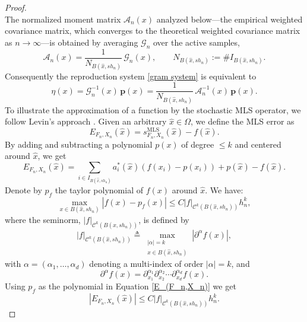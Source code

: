 \documentclass{article}
\newcommand{\mlsfunstoch}{s^\text{MLS}_{F_n,X_n}}
\begin{document}
\begin{proof}
\begin{equation}
    \label{A_nab in main proof}
\end{equation}
The normalized moment matrix $\mathscr{A}_n(x)$ analyzed below---the empirical weighted covariance matrix, which converges to the theoretical weighted covariance matrix as $n\to\infty$---is obtained by averaging $\mathscr{G}_n$ over the active samples,
\begin{equation}
\mathscr{A}_n(x)=\frac{1}{N_{B(\hat{x}, s h_n)}}\,\mathscr{G}_n(x),
\qquad N_{B(\hat{x}, s h_n)}:=\#I_{B(\hat{x}, s h_n)} .
\label{gram normalized relation}
\end{equation}
Consequently the reproduction system \eqref{gram system} is equivalent to
\begin{equation}
\eta(x)=\mathscr{G}_n^{-1}(x)\,\boldsymbol{p}(x)
       =\frac{1}{N_{B(\hat{x}, s h_n)}}\,\mathscr{A}_n^{-1}(x)\,\boldsymbol{p}(x).
\label{eta normalized}
\end{equation}
To illustrate the approximation of a function by the stochastic MLS operator, we follow Levin's approach \cite{levin1998approximation}. Given an arbitrary $\hat{x}\in\Omega$, we define the MLS error as
$$
E_{F_n,X_n}(\hat{x})=\mlsfunstoch(\hat{x})-f(\hat{x}).
$$
By adding and subtracting a polynomial $p(x)$ of degree $\leq k$ and  centered around $\hat{x}$, we get
\begin{equation}
    E_{F_n,X_n}(\hat{x})=\sum_{i \in I_{B\left(\hat{x}, s h_n\right)}} a_i^*(\hat{x})\left(f\left(x_i\right)-p\left(x_i\right)\right)+p(\hat{x})-f(\hat{x}).
    \label{E_(F_n,X_n)}
\end{equation}
Denote by $p_f$ the taylor polynomial of $f(x)$ around $\hat{x}$. We have:
\begin{equation}
    \max _{x \in B(\hat{x}, s h_n)}|f(x)-p_f(x)| \leq C|f|_{\mathcal{C}^k\left(B\left(\hat{x},s h_n\right)\right)} h_n^k,
    \label{taylor reminder}
\end{equation}
where the seminorm, $|f|_{\mathcal{C}^k\left(B\left(\hat{x},s h_n\right)\right)} $, is defined by
$$
|f|_{\mathcal{C}^k\left(B\left(\hat{x},s h_n\right)\right)} \triangleq \max _{\substack{|\alpha|=k \\ x \in B\left(\hat{x}, s h_n\right)}}\left|\partial^\alpha f(x)\right|
,$$
with $\alpha=\left(\alpha_1, \ldots, \alpha_d\right)$ denoting a multi-index of order $|\alpha|=k$, and
$$
\partial^\alpha f(x)=\partial_{x_1}^{\alpha_1} \partial_{x_2}^{\alpha_2} \cdots \partial_{x_d}^{\alpha_d} f(x).
$$
Using $p_f$ as the polynomial in Equation \eqref{E_(F_n,X_n)} we get
$$
\left|E_{F_n,X_n}(\hat{x})\right| \leq C|f|_{\mathcal{C}^k\left(B\left(\hat{x},s h_n\right)\right)} h_n^k .
$$
\end{proof}
\end{document}
